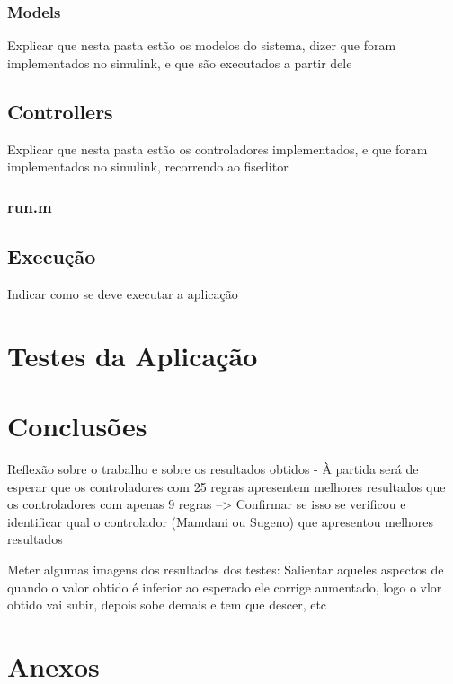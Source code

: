 \documentclass{article}
\begin{document}
\subsubsection{Models}

Explicar que nesta pasta estão os modelos do sistema, dizer que foram implementados no simulink, e que são executados a partir dele

\subsection{Controllers}

Explicar que nesta pasta estão os controladores implementados, e que foram implementados no simulink, recorrendo ao fiseditor

\subsubsection{run.m}


\subsection{Execução}

Indicar como se deve executar a aplicação


\pagebreak

\section{Testes da Aplicação}




\pagebreak

\section{Conclusões}

Reflexão sobre o trabalho e sobre os resultados obtidos - À partida será de esperar que os controladores com 25 regras apresentem melhores resultados que os controladores com apenas 9 regras --> Confirmar se isso se verificou e identificar qual o controlador (Mamdani ou Sugeno) que apresentou melhores resultados

Meter algumas imagens dos resultados dos testes: Salientar aqueles aspectos de quando o valor obtido é inferior ao esperado ele corrige aumentado, logo o vlor obtido vai subir, depois sobe demais e tem que descer, etc

\pagebreak

\section{Anexos}
\end{document}

